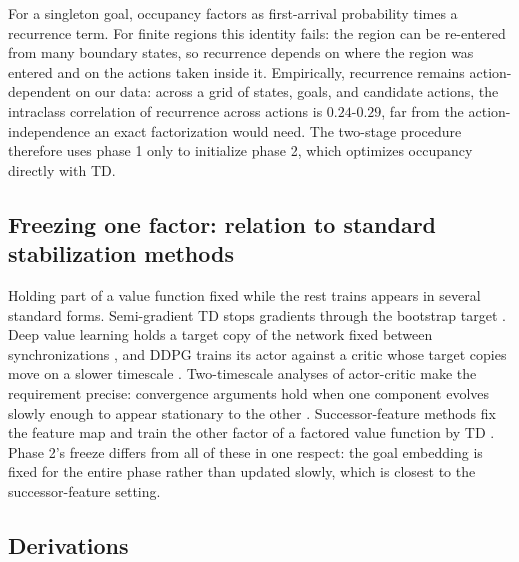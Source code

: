\documentclass{article}
\begin{document}
For a singleton goal, occupancy factors as first-arrival probability times a recurrence term.
For finite regions this identity fails: the region can be re-entered from many boundary states, so recurrence depends on where the region was entered and on the actions taken inside it.
Empirically, recurrence remains action-dependent on our data: across a grid of states, goals, and candidate actions, the intraclass correlation of recurrence across actions is $0.24$-$0.29$, far from the action-independence an exact factorization would need.
The two-stage procedure therefore uses phase 1 only to initialize phase 2, which optimizes occupancy directly with TD.

\subsection{Freezing one factor: relation to standard stabilization methods}
\label{app:freeze}

Holding part of a value function fixed while the rest trains appears in several standard forms.
Semi-gradient TD stops gradients through the bootstrap target \citep{sutton2018reinforcement}.
Deep value learning holds a target copy of the network fixed between synchronizations \citep{mnih2015human}, and DDPG trains its actor against a critic whose target copies move on a slower timescale \citep{lillicrap2016continuous}.
Two-timescale analyses of actor-critic make the requirement precise: convergence arguments hold when one component evolves slowly enough to appear stationary to the other \citep{borkar1997stochastic,konda2000actor}.
Successor-feature methods fix the feature map and train the other factor of a factored value function by TD \citep{barreto2017successor}.
Phase 2's freeze differs from all of these in one respect: the goal embedding is fixed for the entire phase rather than updated slowly, which is closest to the successor-feature setting.

\subsection{Derivations}
\label{app:derivations}
\end{document}

